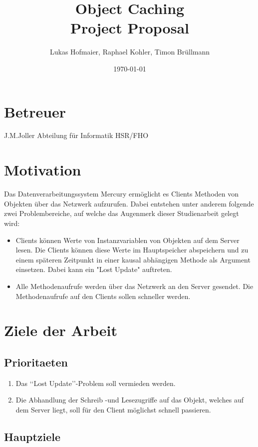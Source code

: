 \documentclass{article}
\title{Object Caching\\Project Proposal}
\author{Lukas Hofmaier, Raphael Kohler, Timon Brüllmann}
\date{\today}
\begin{document}
\maketitle
\section{Betreuer}
J.M.Joller  Abteilung für Informatik HSR/FHO

\section{Motivation}
Das Datenverarbeitungssystem Mercury ermöglicht es Clients Methoden von Objekten über das Netzwerk aufzurufen. Dabei entstehen unter anderem folgende zwei Problembereiche, auf welche das Augenmerk dieser Studienarbeit gelegt wird:

\begin{itemize}
\item Clients können Werte von Instanzvariablen von Objekten auf dem Server lesen. Die Clients können diese Werte im Hauptspeicher abspeichern und zu einem späteren Zeitpunkt in einer kausal abhängigen Methode als Argument einsetzen. Dabei kann ein "Lost Update" auftreten.
\item Alle Methodenaufrufe werden über das Netzwerk an den Server gesendet. Die Methodenaufrufe auf den Clients sollen schneller werden.
\end{itemize}

\section{Ziele der Arbeit}

\subsection{Prioritaeten}
\label{sec:prioritaeten}

\begin{enumerate}
\item Das ‘‘Lost Update’’-Problem soll vermieden werden.
\item Die Abhandlung der Schreib -und Lesezugriffe auf das Objekt, welches auf dem Server liegt, soll für den Client möglichst schnell passieren.
\end{enumerate}

\subsection{Hauptziele}
\label{sec:hauptziele}
\end{document}
